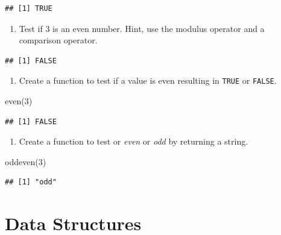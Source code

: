 \documentclass[
]{book}
\newenvironment{Shaded}{\begin{snugshade}}{\end{snugshade}}
\newcommand{\DecValTok}[1]{\textcolor[rgb]{0.00,0.00,0.81}{#1}}
\newcommand{\FunctionTok}[1]{\textcolor[rgb]{0.00,0.00,0.00}{#1}}
\newcommand{\NormalTok}[1]{#1}
\providecommand{\tightlist}{%
  \setlength{\itemsep}{0pt}\setlength{\parskip}{0pt}}
\begin{document}
\begin{verbatim}
## [1] TRUE
\end{verbatim}

\begin{enumerate}
\def\labelenumi{\arabic{enumi}.}
\setcounter{enumi}{2}
\tightlist
\item
  Test if 3 is an even number. Hint, use the modulus operator and a comparison operator.
\end{enumerate}

\begin{verbatim}
## [1] FALSE
\end{verbatim}

\begin{enumerate}
\def\labelenumi{\arabic{enumi}.}
\setcounter{enumi}{3}
\tightlist
\item
  Create a function to test if a value is even resulting in \texttt{TRUE} or \texttt{FALSE}.
\end{enumerate}

\begin{Shaded}
\begin{Highlighting}[]
\FunctionTok{even}\NormalTok{(}\DecValTok{3}\NormalTok{)}
\end{Highlighting}
\end{Shaded}

\begin{verbatim}
## [1] FALSE
\end{verbatim}

\begin{enumerate}
\def\labelenumi{\arabic{enumi}.}
\setcounter{enumi}{3}
\tightlist
\item
  Create a function to test or \emph{even} or \emph{odd} by returning a string.
\end{enumerate}

\begin{Shaded}
\begin{Highlighting}[]
\FunctionTok{oddeven}\NormalTok{(}\DecValTok{3}\NormalTok{)}
\end{Highlighting}
\end{Shaded}

\begin{verbatim}
## [1] "odd"
\end{verbatim}

\hypertarget{data-structures}{%
\chapter{Data Structures}\label{data-structures}}
\end{document}
